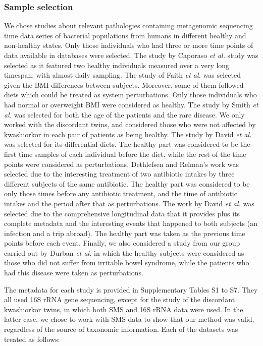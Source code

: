 \subsubsection*{Sample selection}
We chose studies about relevant pathologies containing metagenomic sequencing time data series of bacterial populations from humans in different healthy and non-healthy states. Only those individuals who had three or more time points of data available in databases were selected. The study by Caporaso \textit{et al.} study \cite{moving} was selected as it featured two healthy individuals measured over a very long timespan, with almost daily sampling. The study of Faith \textit{et al.} \cite{LEA} was selected given the BMI differences between subjects. Moreover, some of them followed diets which could be treated as system perturbations. Only those individuals who had normal or overweight BMI were considered as healthy. The study by Smith \textit{et al.} \cite{kwashiorkor} was selected for both the age of the patients and the rare disease. We only worked with the discordant twins, and considered those who were not affected by kwashiorkor in each pair of patients as being healthy. The study by David \textit{et al.} \cite{diet}was selected for its differential diets. The healthy part was considered to be the first time samples of each individual before the diet, while the rest of the time points were considered as perturbations. Dethlefsen and Relman's work \cite{antibiotic} was selected due to the interesting treatment of two antibiotic intakes by three different subjects of the same antibiotic. The healthy part was considered to be only those times before any antibiotic treatment, and the time of antibiotic intakes and the period after that as perturbations. The work by David \textit{et al.} \cite{hostlife} was selected due to the comprehensive longitudinal data that it provides plus its complete metadata and the interesting events that happened to both subjects (an infection and a trip abroad). The healthy part was taken as the previous time points before each event. Finally, we also considered a study from our group carried out by Durban \textit{et al.} \cite{IBS} in which the healthy subjects were considered as those who did not suffer from irritable bowel syndrome, while the patients who had this disease were taken as perturbations. 

The metadata for each study is provided in Supplementary Tables S1 to S7. They all used 16S rRNA gene sequencing, except for the study of the discordant kwashiorkor twins\cite{kwashiorkor}, in which both SMS and 16S rRNA data were used. In the latter case, we chose to work with SMS data to show that our method was valid, regardless of the source of taxonomic information. Each of the datasets was treated as follows:

